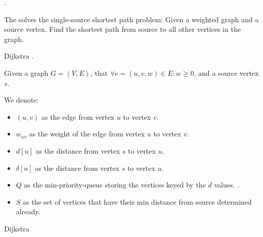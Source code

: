 
  \par {}.


    \par The  solves the single-source shortest path
      problem: Given a weighted graph and a source vertex. Find the shortest
      path from source to all other vertices in the graph.

    \par Dijkstra .

    \par Given a graph $G = (V, E)$, that $\forall e = (u, v, w) \in E: w \geq
    0$, and a source vertex $s$.
    \par We denote:
    \begin{itemize}
      \item $(u, v)$ as the edge from vertex $u$ to vertex $v$.
      \item $w_{uv}$ as the weight of the edge from vertex $u$ to vertex $v$.
      \item $d[u]$ as the distance from vertex $s$ to vertex $u$.
      \item $\delta[u]$ as the  distance from vertex $s$ to vertex
        $u$.
      \item $Q$ as the min-priority-queue storing the vertices keyed by the
        $d$ values. .
      \item $S$ as the set of vertices that have their min distance from source
        determined already.
    \end{itemize}

    \begin{algorithm}[H]
      \caption{Dijkstra}
      \begin{algorithmic}[1]
          \EndFor
          \State{}
              \State{}
            \EndFor
          \EndWhile
        \EndFunction

        \State

              \State{}
            \Else
              \State{}
            \EndIf
          \EndIf
        \EndFunction
      \end{algorithmic}
    \end{algorithm}

